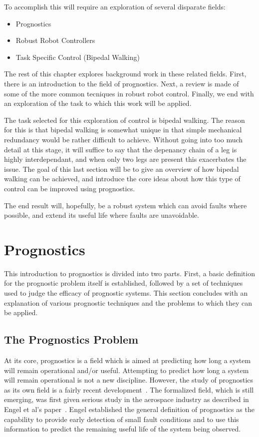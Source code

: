 \documentclass[12pt]{article}
\begin{document}
To accomplish this will require an exploration of several disparate
fields:
\begin{itemize}
\item Prognostics
\item Robust Robot Controllers
\item Task Specific Control (Bipedal Walking)
\end{itemize}
The rest of this chapter explores background work in these related
fields.  First, there is an introduction to the field of prognostics.
Next, a review is made of some of the more common tecniques in robust
robot control.  Finally, we end with an exploration of the task to
which this work will be applied.

The task selected for this exploration of control is bipedal walking.
The reason for this is that bipedal walking is somewhat unique in that
simple mechanical redundancy would be rather difficult to achieve.
Without going into too much detail at this stage, it will suffice to
say that the depenancy chain of a leg is highly interdependant, and
when only two legs are present this exacerbates the issue.  The goal
of this last section will be to give an overview of how bipedal
walking can be achieved, and introduce the core ideas about how this
type of control can be improved using prognostics.

The end result will, hopefully, be a robust system which can avoid
faults where possible, and extend its useful life where faults are
unavoidable.

\section{Prognostics}
This introduction to prognostics is divided into two parts.  First, a
basic definition for the prognostic problem itself is established,
followed by a set of techniques used to judge the efficacy of
prognostic systems.  This section concludes with an explanation of
various prognostic techniques and the problems to which they can be
applied.


\subsection{The Prognostics Problem}
At its core, prognostics is a field which is aimed at predicting how
long a system will remain operational and/or useful.  Attempting to
predict how long a system will remain operational is not a new
discipline.  However, the study of prognostics as its own field is a
fairly recent development~\cite{877920}.  The formalized field, which
is still emerging, was first given serious study in the aerospace
industry as described in Engel et al's paper~\cite{877920}.  Engel
established the general definition of prognostics as the capability to
provide early detection of small fault conditions and to use this
information to predict the remaining useful life of the system being
observed.
\end{document}
